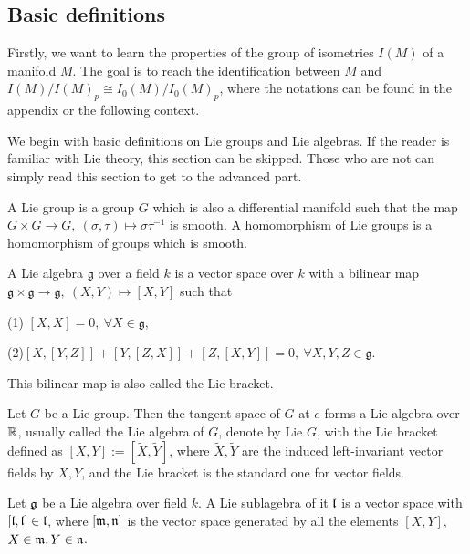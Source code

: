 \subsection{Basic definitions}

Firstly, we want to learn the properties of the group of
isometries $I(M)$ of a manifold $M$. The goal is to reach the
identification between $M$ and $I(M)/I(M)_p\cong
I_0(M)/I_0(M)_p$, where the notations can be found in the
appendix or the following context.

We begin with basic definitions on Lie groups and Lie algebras.
If the reader is familiar with Lie theory, this section can be
skipped. Those who are not can simply read this section to get to
the advanced part.
\begin{definition}
	A Lie group is a group $G$ which is also a differential
	manifold such that the map $G\times G\to G,\
	(\sigma, \tau)\mapsto \sigma\tau^{-1}$ is smooth. A
	homomorphism of Lie groups is a homomorphism of groups which
	is smooth.
\end{definition}

\begin{definition}
	A Lie algebra $\mathfrak{g}$ over a field $k$ is a vector
	space over $k$  with a bilinear map
	$\mathfrak{g}\times\mathfrak{g}\to \mathfrak{g},\
	(X, Y)\mapsto [X, Y]$  such that
	
	(1) $[X,X]=0,\ \forall X\in \mathfrak{g} $,
	
	(2)$[X, [Y, Z]]+[Y, [Z, X]]+[Z, [X, Y]]=0,\ \forall X, Y, Z\in
	\mathfrak{g}$.
	
	This bilinear map is also called the Lie bracket.
\end{definition}

\begin{theorem}
	Let $G$ be a Lie group. Then the tangent space of $G$ at $e$
	forms a Lie algebra over ${\mathbb R}$, usually called the Lie algebra
	of $G$, denote by Lie $G$, with the Lie bracket defined as
	$[X,Y]:=[\tilde X, \tilde Y]$, where $\tilde X, \tilde Y$ are
	the induced left-invariant vector fields by $X, Y$, and the
	Lie bracket is the standard one for vector fields.
\end{theorem}

\begin{definition}
	Let ${\mathfrak g}$ be a Lie algebra over field $k$. A Lie sublagebra
	of it ${\mathfrak l}$ is a vector space  with $[{\mathfrak l}, {\mathfrak l}]\in {\mathfrak l}$,
	where $[{\mathfrak m}, {\mathfrak n}]$ is the vector space generated by all the
	elements $[X, Y]$, $X\in {\mathfrak m}, Y\in {\mathfrak n}$.
\end{definition}

